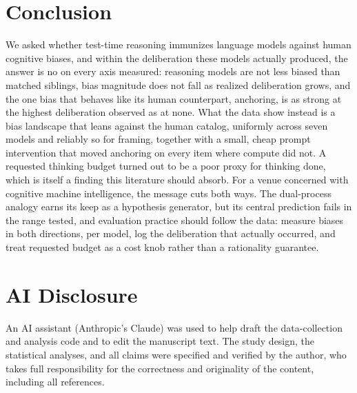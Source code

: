 \documentclass[conference]{IEEEtran}
\begin{document}
\section{Conclusion}

We asked whether test-time reasoning immunizes language models against human cognitive biases, and within the deliberation these models actually produced, the answer is no on every axis measured: reasoning models are not less biased than matched siblings, bias magnitude does not fall as realized deliberation grows, and the one bias that behaves like its human counterpart, anchoring, is as strong at the highest deliberation observed as at none. What the data show instead is a bias landscape that leans against the human catalog, uniformly across seven models and reliably so for framing, together with a small, cheap prompt intervention that moved anchoring on every item where compute did not. A requested thinking budget turned out to be a poor proxy for thinking done, which is itself a finding this literature should absorb. For a venue concerned with cognitive machine intelligence, the message cuts both ways. The dual-process analogy earns its keep as a hypothesis generator, but its central prediction fails in the range tested, and evaluation practice should follow the data: measure biases in both directions, per model, log the deliberation that actually occurred, and treat requested budget as a cost knob rather than a rationality guarantee.

\section*{AI Disclosure}
An AI assistant (Anthropic's Claude) was used to help draft the data-collection and analysis code and to edit the manuscript text. The study design, the statistical analyses, and all claims were specified and verified by the author, who takes full responsibility for the correctness and originality of the content, including all references.



\end{document}
